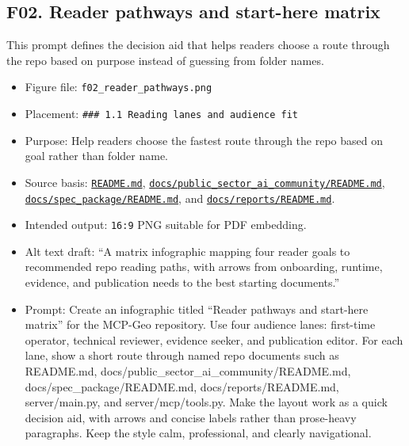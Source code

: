 \subsection{F02. Reader pathways and start-here
matrix}\label{f02.-reader-pathways-and-start-here-matrix}

This prompt defines the decision aid that helps readers choose a route
through the repo based on purpose instead of guessing from folder names.

\begin{itemize}
\tightlist
\item
  Figure file: \texttt{f02\_reader\_pathways.png}
\item
  Placement: \texttt{\#\#\#\ 1.1\ Reading\ lanes\ and\ audience\ fit}
\item
  Purpose: Help readers choose the fastest route through the repo based
  on goal rather than folder name.
\item
  Source basis:
  \href{https://github.com/chris-page-gov/mcp-geo/blob/fe862910da246ca77f374cfbe484985f5df4d316/README.md}{\texttt{README.md}},
  \href{https://github.com/chris-page-gov/mcp-geo/blob/fe862910da246ca77f374cfbe484985f5df4d316/docs/public_sector_ai_community/README.md}{\texttt{docs/public\_sector\_ai\_community/README.md}},
  \href{https://github.com/chris-page-gov/mcp-geo/blob/fe862910da246ca77f374cfbe484985f5df4d316/docs/spec_package/README.md}{\texttt{docs/spec\_package/README.md}},
  and
  \href{https://github.com/chris-page-gov/mcp-geo/blob/fe862910da246ca77f374cfbe484985f5df4d316/docs/reports/README.md}{\texttt{docs/reports/README.md}}.
\item
  Intended output: \texttt{16:9} PNG suitable for PDF embedding.
\item
  Alt text draft: ``A matrix infographic mapping four reader goals to
  recommended repo reading paths, with arrows from onboarding, runtime,
  evidence, and publication needs to the best starting documents.''
\item
  Prompt: Create an infographic titled ``Reader pathways and start-here
  matrix'' for the MCP-Geo repository. Use four audience lanes:
  first-time operator, technical reviewer, evidence seeker, and
  publication editor. For each lane, show a short route through named
  repo documents such as README.md,
  docs/public\_sector\_ai\_community/README.md,
  docs/spec\_package/README.md, docs/reports/README.md, server/main.py,
  and server/mcp/tools.py. Make the layout work as a quick decision aid,
  with arrows and concise labels rather than prose-heavy paragraphs.
  Keep the style calm, professional, and clearly navigational.
\end{itemize}

